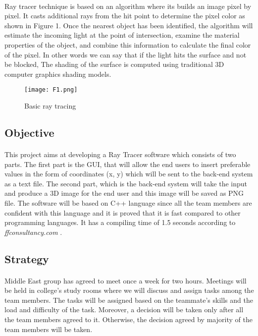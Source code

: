 \documentclass{article}
\begin{document}
\paragraph{}
Ray tracer technique is based on an algorithm where its builds an image pixel by pixel. It casts additional rays from the hit point to determine the pixel color as shown in Figure 1.
Once the nearest object has been identified, the algorithm will estimate the incoming light at the point of intersection, examine the material properties of the object, and combine this information to calculate the final color of the pixel. In other words we can say that if the light hits the surface and not be blocked,  The shading of the surface is computed using traditional 3D computer graphics shading models. 

\begin{figure}
    \centering
    \texttt{[image: F1.png]}
    \caption{Basic ray tracing}
    \label{figure1}
\end{figure}

\subsection{Objective}

\paragraph{}
This project aims at developing a Ray Tracer software which consists of two parts. The first part is the GUI, that will allow the end users to insert preferable values in the form of coordinates (x, y) which will be sent to the back-end system as a text file.
The second part, which is the back-end system will take the input and produce  a 3D image for the end user and this image will be saved as PNG file. 
The software will be based on C++ language since all the team members are confident with this language and it is proved that it is fast compared to other programming languages. It has a compiling time of 1.5 seconds according to \textit{ffconsultancy.com }.

\subsection{Strategy}
\paragraph{}
Middle East group has agreed to meet once a week for two hours. Meetings will be held in college's study rooms where we will discuss and assign tasks among the team members. The tasks will be assigned based on the teammate's skills and the load and difficulty of the task. Moreover,  a decision will be taken only after all the team members agreed to it. Otherwise, the decision agreed by majority of the team members will be taken.
\end{document}
